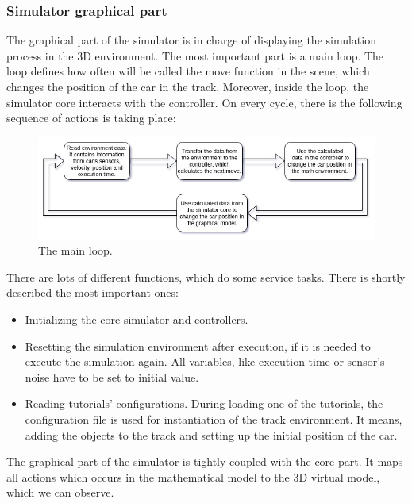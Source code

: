 \subsubsection{Simulator graphical part}
The graphical part of the simulator is in charge of displaying the simulation process in the 3D environment. The most important part is a main loop. The loop defines how often will be called the move function in the scene, which changes the position of the car in the track. Moreover, inside the loop, the simulator core interacts with the controller. On every cycle, there is the following sequence of actions is taking place:
\begin{figure}[h!]
    \centering
    \includegraphics[width=0.7\linewidth]{src/pic/main-loop}
    \caption{The main loop.}
    \label{fig:main-loop}
\end{figure} \newline
There are lots of different functions, which do some service tasks. There is shortly described the most important ones:
\begin{itemize}
    \item Initializing the core simulator and controllers.
    \item Resetting the simulation environment after execution, if it is needed to execute the simulation again. All variables, like execution time or sensor's noise have to be set to initial value.
    \item Reading tutorials' configurations. During loading one of the tutorials, the configuration file is used for instantiation of the track environment. It means, adding the objects to the track and setting up the initial position of the car.
\end{itemize}
The graphical part of the simulator is tightly coupled with the core part. It maps all actions which occurs in the mathematical model to the 3D virtual model, which we can observe. 
